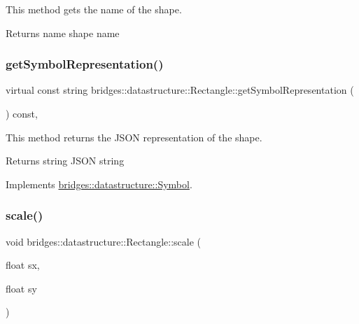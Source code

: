 This method gets the name of the shape. 

\begin{DoxyReturn}{Returns}
name shape name 
\end{DoxyReturn}
\mbox{\label{classbridges_1_1datastructure_1_1_rectangle_ada89ed40d2515a3518084f5460ba8dac}} 
\subsubsection{\texorpdfstring{get\+Symbol\+Representation()}{getSymbolRepresentation()}}
{\footnotesize\ttfamily virtual const string bridges\+::datastructure\+::\+Rectangle\+::get\+Symbol\+Representation (\begin{DoxyParamCaption}{ }\end{DoxyParamCaption}) const\hspace{0.3cm}{\ttfamily [inline]}, {\ttfamily [virtual]}}



This method returns the J\+S\+ON representation of the shape. 

\begin{DoxyReturn}{Returns}
string J\+S\+ON string 
\end{DoxyReturn}


Implements \hyperlink{classbridges_1_1datastructure_1_1_symbol_a8044b3da559dcd9de8510ae339f126c8}{bridges\+::datastructure\+::\+Symbol}.

\mbox{\label{classbridges_1_1datastructure_1_1_rectangle_ae17021407556e0d434b54a81d94614b3}} 
\subsubsection{\texorpdfstring{scale()}{scale()}}
{\footnotesize\ttfamily void bridges\+::datastructure\+::\+Rectangle\+::scale (\begin{DoxyParamCaption}\item[{float}]{sx,  }\item[{float}]{sy }\end{DoxyParamCaption})\hspace{0.3cm}{\ttfamily [inline]}}




